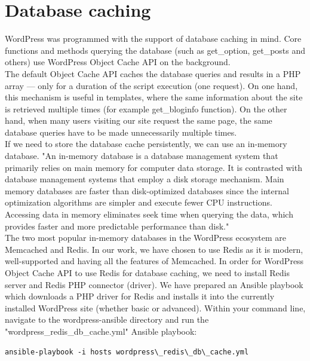 \section{Database caching}

WordPress was programmed with the support of database caching in mind. Core functions and methods querying the database (such as get\_option, get\_posts and others) use WordPress Object Cache API \cite{WP:Object-Cache-API} on the background. \\

The default Object Cache API caches the database queries and results in a PHP array — only for a duration of the script execution (one request). On one hand, this mechanism is useful in templates, where the same information about the site is retrieved multiple times (for example get\_bloginfo function). On the other hand, when many users visiting our site request the same page, the same database queries have to be made unnecessarily multiple times. \\

If we need to store the database cache persistently, we can use an in-memory database. "An in-memory database is a database management system that primarily relies on main memory for computer data storage. It is contrasted with database management systems that employ a disk storage mechanism. Main memory databases are faster than disk-optimized databases since the internal optimization algorithms are simpler and execute fewer CPU instructions. Accessing data in memory eliminates seek time when querying the data, which provides faster and more predictable performance than disk." \cite{Wiki:in-memory-database}\\

The two most popular in-memory databases in the WordPress ecosystem are Memcached and Redis. In our work, we have chosen to use Redis as it is modern, well-supported and having all the features of Memcached. \cite{SO:Redis-vs-Memcached} In order for WordPress Object Cache API to use Redis for database caching, we need to install Redis server and Redis PHP connector (driver). We have prepared an Ansible playbook which downloads a PHP driver for Redis and installs it into the currently installed WordPress site (whether basic or advanced). Within your command line, navigate to the wordpress-ansible directory and run the "wordpress\_redis\_db\_cache.yml" Ansible playbook:

\begin{lstlisting}
ansible-playbook -i hosts wordpress\_redis\_db\_cache.yml
\end{lstlisting}

